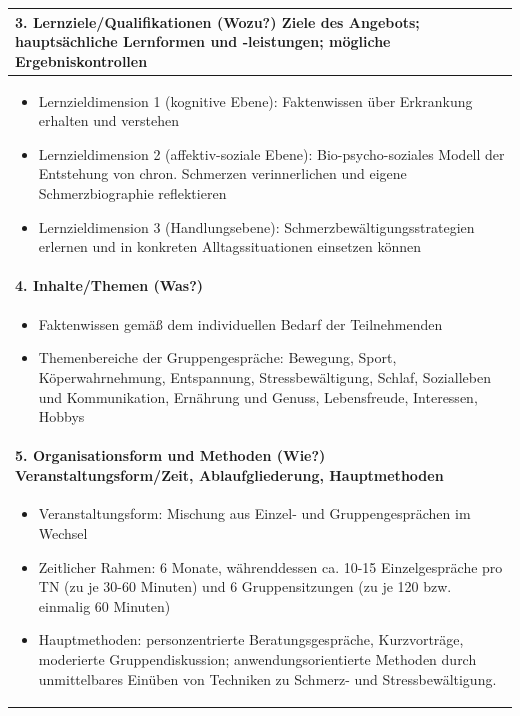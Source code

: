 \documentclass[
  twoside,
  parskip=half-,
  paper=176mm:246mm,
  BCOR=14mm,
  DIV=14,
]{scrreprt}
\begin{document}
\begin{center}
\begin{longtable}{p{}}
    \bfseries 3. Lernziele/Qualifikationen (Wozu?)\newline 
      Ziele des Angebots; hauptsächliche Lernformen und -leistungen; mögliche Ergebniskontrollen \\\hline
    \begin{itemize}[nosep, topsep=-10pt]
    \item Lernzieldimension 1 (kognitive Ebene): Faktenwissen über Erkrankung erhalten und verstehen
    \item Lernzieldimension 2 (affektiv-soziale Ebene): Bio-psycho-soziales Modell der Entstehung von chron. Schmerzen verinnerlichen und eigene Schmerzbiographie reflektieren
    \item Lernzieldimension 3 (Handlungsebene): Schmerzbewältigungsstrategien erlernen und in konkreten Alltagssituationen einsetzen können
    \end{itemize} \\\hline
    \bfseries 4. Inhalte/Themen (Was?) \\\hline
    \begin{itemize}[nosep, topsep=-10pt]
    \item Faktenwissen gemäß dem individuellen Bedarf der Teilnehmenden
    \item Themenbereiche der Gruppengespräche: 
    Bewegung, Sport, Köperwahrnehmung,
    Entspannung, Stressbewältigung, Schlaf,
    Sozialleben und Kommunikation,
    Ernährung und Genuss,
    Lebensfreude, Interessen, Hobbys
    \end{itemize} \\\hline
    \bfseries 5. Organisationsform und Methoden (Wie?) \newline
    Veranstaltungsform/Zeit, Ablaufgliederung, Hauptmethoden \\\hline
    \begin{itemize}[nosep, topsep=-10pt]
    \item Veranstaltungsform: Mischung aus Einzel- und Gruppengesprächen im Wechsel
    \item Zeitlicher Rahmen: 6 Monate, währenddessen ca. 10-15 Einzelgespräche pro TN (zu je 30-60 Minuten) und 6 Gruppensitzungen (zu je 120 bzw. einmalig 60 Minuten)
    \item Hauptmethoden: personzentrierte Beratungsgespräche, Kurzvorträge, moderierte Gruppendiskussion; anwendungsorientierte Methoden durch unmittelbares Einüben von Techniken zu Schmerz- und Stressbewältigung.
    \end{itemize} \\\hline

\end{longtable}
\end{center}
\end{document}

